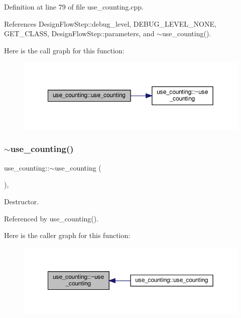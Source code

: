 Definition at line 79 of file use\+\_\+counting.\+cpp.



References Design\+Flow\+Step\+::debug\+\_\+level, D\+E\+B\+U\+G\+\_\+\+L\+E\+V\+E\+L\+\_\+\+N\+O\+NE, G\+E\+T\+\_\+\+C\+L\+A\+SS, Design\+Flow\+Step\+::parameters, and $\sim$use\+\_\+counting().

Here is the call graph for this function\+:
\nopagebreak
\begin{figure}[H]
\begin{center}
\leavevmode
\includegraphics[width=350pt]{d4/d2e/classuse__counting_aa642d9fb1069098c5d783426503562cc_cgraph}
\end{center}
\end{figure}
\mbox{\label{classuse__counting_a90fc0f0d8a9821ee13e8a2fec93e2949}} 
\subsubsection{\texorpdfstring{$\sim$use\+\_\+counting()}{~use\_counting()}}
{\footnotesize\ttfamily use\+\_\+counting\+::$\sim$use\+\_\+counting (\begin{DoxyParamCaption}{ }\end{DoxyParamCaption})\hspace{0.3cm}{\ttfamily [override]}, {\ttfamily [default]}}



Destructor. 



Referenced by use\+\_\+counting().

Here is the caller graph for this function\+:
\nopagebreak
\begin{figure}[H]
\begin{center}
\leavevmode
\includegraphics[width=350pt]{d4/d2e/classuse__counting_a90fc0f0d8a9821ee13e8a2fec93e2949_icgraph}
\end{center}
\end{figure}



